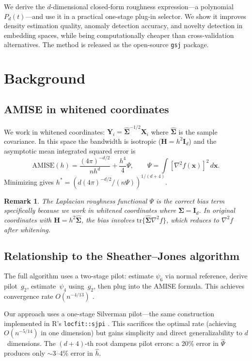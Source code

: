 \documentclass[numsec,webpdf,modern,medium,namedate]{oup-authoring-template}
\theoremstyle{thmstyleone}
\theoremstyle{thmstyletwo}
\newtheorem{remark}{Remark}
\theoremstyle{thmstylethree}
\newcommand{\bx}{\bm{x}}
\newcommand{\bX}{\bm{X}}
\newcommand{\bY}{\bm{Y}}
\newcommand{\bSigma}{\bm{\Sigma}}
\newcommand{\Id}{\bm{I}_d}
\begin{document}
We derive the $d$-dimensional closed-form roughness expression---a polynomial $P_d(t)$---and use it in a practical one-stage plug-in selector. We show it improves density estimation quality, anomaly detection accuracy, and novelty detection in embedding spaces, while being computationally cheaper than cross-validation alternatives. The method is released as the open-source \texttt{gsj} package.


\section{Background}\label{sec:background}

\subsection{AMISE in whitened coordinates}

We work in whitened coordinates: $\bY_i = \hat{\bSigma}^{-1/2}\bX_i$ where $\hat{\bSigma}$ is the sample covariance. In this space the bandwidth is isotropic ($\bm{H} = h^2\Id$) and the asymptotic mean integrated squared error is
\begin{equation}
\text{AMISE}(h) = \frac{(4\pi)^{-d/2}}{nh^d} + \frac{h^4}{4}\Psi, \qquad \Psi = \int [\nabla^2 f(\bx)]^2 \, d\bx.
\label{eq:amise}
\end{equation}
Minimizing gives $h^* = (d(4\pi)^{-d/2}/(n\Psi))^{1/(d+4)}$.

\begin{remark}
The Laplacian roughness functional $\Psi$ is the correct bias term specifically because we work in whitened coordinates where $\bSigma = \Id$. In original coordinates with $\bm{H} = h^2\hat{\bSigma}$, the bias involves $\mathrm{tr}\{\hat{\bSigma}\nabla^2 f\}$, which reduces to $\nabla^2 f$ after whitening.
\end{remark}

\subsection{Relationship to the Sheather--Jones algorithm}

The full \citet{sheather1991} algorithm uses a two-stage pilot: estimate $\psi_6$ via normal reference, derive pilot~$g_2$, estimate~$\psi_4$ using~$g_2$, then plug into the AMISE formula. This achieves convergence rate $O(n^{-4/13})$ \citep{hall1991}.

Our approach uses a one-stage Silverman pilot---the same construction implemented in R's \texttt{locfit::sjpi} \citep{loader1999}. This sacrifices the optimal rate (achieving $O(n^{-5/14})$ in one dimension) but gains simplicity and direct generalizability to $d$~dimensions. The $(d+4)$-th root dampens pilot errors: a 20\% error in $\hat{\Psi}$ produces only $\sim$3--4\% error in $\hat{h}$.
\end{document}
